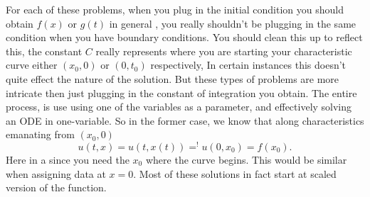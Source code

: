 \documentclass{article}
\theoremstyle{definition}
\begin{document}
	{\color{red} For each of these problems, when you plug in the initial condition you should obtain $f(x)$ or $g(t)$ in general , you really shouldn't be plugging in the same condition when you have boundary conditions. You should clean this up to reflect this, the constant $C$ really represents where you are starting your characteristic curve either $(x_{0},0)$ or $(0,t_{0})$ respectively, In certain instances this doesn't quite effect the nature of the solution. But these types of problems are more intricate then just plugging in the constant of integration you obtain. The entire process, is use using one of the variables as a parameter, and effectively solving an ODE in one-variable. So in the former case, we know that along characteristics emanating from $(x_{0},0)$ 
    $$
    u(t,x) = u(t,x(t)) =^{!} u(0,x_{0}) = f(x_{0}). 
    $$ 
    Here in a since you need the $x_{0}$ where the curve begins. This would be similar when assigning data at $x=0$. Most of these solutions in fact start at scaled version of the function. 
 }	
	
\end{document}

